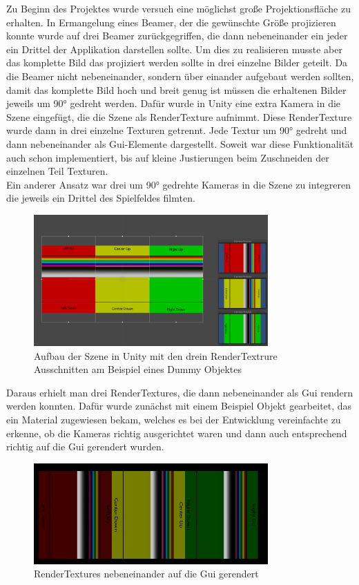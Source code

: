 
Zu Beginn des Projektes wurde versuch eine möglichst große Projektionsfläche zu erhalten. In Ermangelung eines Beamer, der die gewünschte Größe projizieren konnte wurde auf drei Beamer zurückgegriffen, die dann nebeneinander ein jeder ein Drittel der Applikation darstellen sollte. Um dies zu realisieren musste aber das komplette Bild das projiziert werden sollte in drei einzelne Bilder geteilt. Da die Beamer nicht nebeneinander, sondern über einander aufgebaut werden sollten, damit das komplette Bild hoch und breit genug ist müssen die erhaltenen Bilder jeweils um 90° gedreht werden. Dafür wurde in Unity eine extra Kamera in die Szene eingefügt, die die Szene als RenderTexture aufnimmt. Diese RenderTexture wurde dann in drei einzelne Texturen getrennt. Jede Textur um 90° gedreht und dann nebeneinander als Gui-Elemente dargestellt. Soweit war diese Funktionalität auch schon implementiert, bis auf kleine Justierungen beim Zuschneiden der einzelnen Teil Texturen. \\
Ein anderer Ansatz war drei um 90° gedrehte Kameras in die Szene zu integreren die jeweils ein Drittel des Spielfeldes filmten. 
\begin{figure}[h]
	\centering
		\includegraphics[width=0.8\textwidth]{images/RenderTextureBeispielSzene.PNG}
	\caption{Aufbau der Szene in Unity mit den drein RenderTextrure Ausschnitten am Beispiel eines Dummy Objektes}
	\label{fig:RenderTextureBeispielSzene}
\end{figure}
Daraus erhielt man drei RenderTextures, die dann nebeneinander als Gui rendern werden konnten. Dafür wurde zunächst mit einem Beispiel Objekt gearbeitet, das ein Material zugewiesen bekam, welches es bei der Entwicklung vereinfachte zu erkenne, ob die Kameras richtig ausgerichtet waren und dann auch entsprechend richtig auf die Gui gerendert wurden. 
\begin{figure}[h]
	\centering
		\includegraphics[width=0.8\textwidth]{images/RenderTexturesAlsGui.PNG}
	\caption{RenderTextures nebeneinander auf die Gui gerendert}
	\label{fig:RenderTexturesAlsGui}
\end{figure}\\
